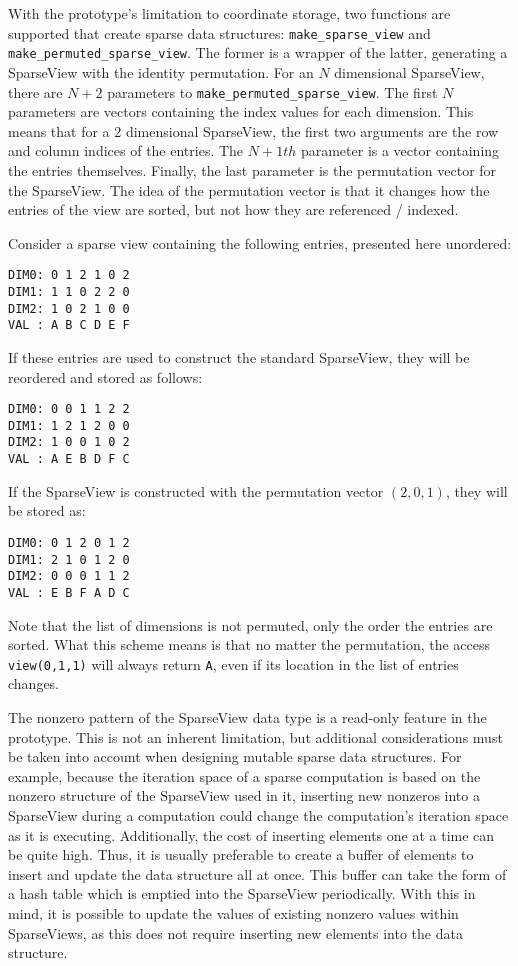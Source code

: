 With the prototype's limitation to coordinate storage, two functions are supported that create sparse data structures: \verb.make_sparse_view. and \verb.make_permuted_sparse_view..
The former is a wrapper of the latter, generating a SparseView with the identity permutation.
For an $N$ dimensional SparseView, there are $N+2$ parameters to \verb.make_permuted_sparse_view..
The first $N$ parameters are vectors containing the index values for each dimension. 
This means that for a 2 dimensional SparseView, the first two arguments are the row and column indices of the entries.
The $N+1th$ parameter is a vector containing the entries themselves. 
Finally, the last parameter is the permutation vector for the SparseView. 
The idea of the permutation vector is that it changes how the entries of the view are sorted, but not how they are referenced / indexed.

Consider a sparse view containing the following entries, presented here unordered:
\begin{lstlisting}
DIM0: 0 1 2 1 0 2
DIM1: 1 1 0 2 2 0
DIM2: 1 0 2 1 0 0
VAL : A B C D E F 
\end{lstlisting}
If these entries are used to construct the standard SparseView, they will be reordered and stored as follows:
\begin{lstlisting}
DIM0: 0 0 1 1 2 2
DIM1: 1 2 1 2 0 0
DIM2: 1 0 0 1 0 2
VAL : A E B D F C
\end{lstlisting}
If the SparseView is constructed with the permutation vector $(2,0,1)$, they will be stored as:
\begin{lstlisting}
DIM0: 0 1 2 0 1 2
DIM1: 2 1 0 1 2 0
DIM2: 0 0 0 1 1 2
VAL : E B F A D C
\end{lstlisting}
Note that the list of dimensions is not permuted, only the order the entries are sorted. 
What this scheme means is that no matter the permutation, the access \verb.view(0,1,1). will always return \verb.A., even if its location in the list of entries changes.

The nonzero pattern of the SparseView data type is a read-only feature in the prototype.
This is not an inherent limitation, but additional considerations must be taken into account when designing mutable sparse data structures.
For example, because the iteration space of a sparse computation is based on the nonzero structure of the SparseView used in it, inserting new nonzeros into a SparseView during a computation could change the computation's iteration space as it is executing.
Additionally, the cost of inserting elements one at a time can be quite high. 
Thus, it is usually preferable to create a buffer of elements to insert and update the data structure all at once.
This buffer can take the form of a hash table which is emptied into the SparseView periodically.
With this in mind, it is possible to update the values of existing nonzero values within SparseViews, as this does not require inserting new elements into the data structure.

